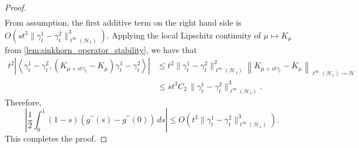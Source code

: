 \documentclass{article}
\theoremstyle{plain}
\theoremstyle{definition}
\theoremstyle{remark}
\newcommand{\of}[1]{\left(#1\right)}
\newcommand{\abs}[1]{\left|#1\right|}
\newcommand{\cH}{\mathcal{H}}
\newcommand{\1}{\mathbbm{1}}
\newcommand{\iprod}[1]{\left\langle #1 \right\rangle}
\newcommand{\norm}[1]{\left \| #1 \right \|}
\theoremstyle{plain}
\theoremstyle{definition}
\begin{document}
\begin{proof}
\begin{align*}
    \end{align*}
    From assumption, the first additive term on the right hand side is $O\of{st^3 \| \gamma_t^1 - \gamma_t^2\|_{\ell^\infty(\cH_1)}^3}$. Applying the local Lipschitz continuity of $\mu \mapsto K_\mu$ from \cref{lem:sinkhorn_operator_stability}, we have that
    \begin{align*}
        t^2 \abs{\iprod{\gamma_t^1-\gamma_t^2, (K_{\mu + st\gamma_t} - K_{\mu}) \gamma_t^1-\gamma_t^2}}
        &\leq t^2 \|\gamma_t^1-\gamma_t^2\|_{\ell^\infty(\cH_1)}^2 \norm{K_{\mu + st\gamma_t} - K_{\mu}}_{\ell^\infty(\cH_1) \to \cH}\\
        &\leq st^3 C_2\,\|\gamma_t^1 - \gamma_t^2\|_{\ell^\infty(\cH_1)}^3.
    \end{align*}
    Therefore,
    \[
     \abs{\frac{1}{2}\int_0^1 (1-s) (g^{\prime\prime}(s) - g^{\prime\prime}(0)) \, ds} \leq O\of{t^3 \| \gamma_t^1 - \gamma_t^2\|_{\ell^\infty(\cH_1)}^3}.
    \]
    This completes the proof.
    
\end{proof}
\end{document}
